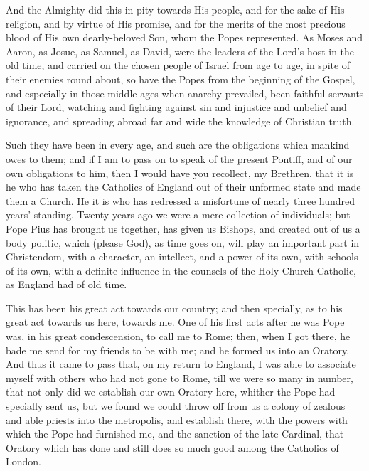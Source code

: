And the Almighty did this in pity towards His people,
and for the sake of His religion, and by virtue of His
promise, and for the merits of the most precious blood of
His own dearly-beloved Son, whom the Popes represented.
As Moses and Aaron, as Josue, as Samuel, as David, were
the leaders of the Lord's host in the old time, and
carried on the chosen people of Israel from age to age,
in spite of their enemies round about, so have the Popes
from the beginning of the Gospel, and especially in those
middle ages when anarchy prevailed, been faithful
servants of their Lord, watching and fighting against sin
and injustice and unbelief and ignorance, and spreading
abroad far and wide the knowledge of Christian truth.

Such they have been in every age, and such are the
obligations which mankind owes to them; and if I am to
pass on to speak of the present Pontiff, and of our own
obligations to him, then I would have you recollect, my
Brethren, that it is he who has taken the Catholics of
England out of their unformed state and made them a
Church. He it is who has redressed a misfortune of nearly
three hundred years' standing. Twenty years ago we were a
mere collection of individuals; but Pope Pius has brought
us together, has given us Bishops, and created out of us
a body politic, which (please God), as time goes on, will
play an important part in Christendom, with a character,
an intellect, and a power of its own, with schools of its
own, with a definite influence in the counsels of the
Holy Church Catholic, as England had of old time.

This has been his great act towards our country; and
then specially, as to his great act towards us here,
towards me. One of his first acts after he was Pope was,
in his great condescension, to call me to Rome; then,
when I got there, he bade me send for my friends to be
with me; and he formed us into an Oratory. And thus it
came to pass that, on my return to England, I was able to
associate myself with others who had not gone to Rome,
till we were so many in number, that not only did we
establish our own Oratory here, whither the Pope had
specially sent us, but we found we could throw off from
us a colony of zealous and able priests into the
metropolis, and establish there, with the powers with
which the Pope had furnished me, and the sanction of the
late Cardinal, that Oratory which has done and still does
so much good among the Catholics of London.

